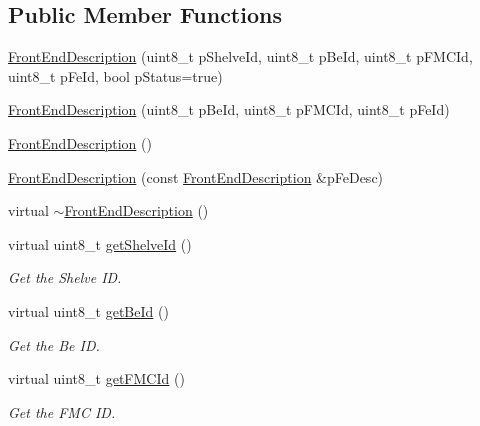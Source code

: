 \subsection*{Public Member Functions}
\begin{DoxyCompactItemize}
\item 
\hyperlink{class_ph2___hw_description_1_1_front_end_description_a9605f28b75ce29cba767fe6efb9d9d19}{Front\-End\-Description} (uint8\-\_\-t p\-Shelve\-Id, uint8\-\_\-t p\-Be\-Id, uint8\-\_\-t p\-F\-M\-C\-Id, uint8\-\_\-t p\-Fe\-Id, bool p\-Status=true)
\item 
\hyperlink{class_ph2___hw_description_1_1_front_end_description_a38c5f465c7227c8cf3f897ab88f9598c}{Front\-End\-Description} (uint8\-\_\-t p\-Be\-Id, uint8\-\_\-t p\-F\-M\-C\-Id, uint8\-\_\-t p\-Fe\-Id)
\item 
\hyperlink{class_ph2___hw_description_1_1_front_end_description_a3fc1d338b2fb7eca2c8b0038ed235daf}{Front\-End\-Description} ()
\item 
\hyperlink{class_ph2___hw_description_1_1_front_end_description_ada01bf978797bf26295f1947b6896efa}{Front\-End\-Description} (const \hyperlink{class_ph2___hw_description_1_1_front_end_description}{Front\-End\-Description} \&p\-Fe\-Desc)
\item 
virtual \hyperlink{class_ph2___hw_description_1_1_front_end_description_a8ff5e1dc9dc09e6db9c105a362000e89}{$\sim$\-Front\-End\-Description} ()
\item 
virtual uint8\-\_\-t \hyperlink{class_ph2___hw_description_1_1_front_end_description_a2599816f65ecea30824cd3d8fe1fcadc}{get\-Shelve\-Id} ()
\begin{DoxyCompactList}\small\item\em Get the Shelve I\-D. \end{DoxyCompactList}\item 
virtual uint8\-\_\-t \hyperlink{class_ph2___hw_description_1_1_front_end_description_ae2d759253890ec653dbe1b5c3141887a}{get\-Be\-Id} ()
\begin{DoxyCompactList}\small\item\em Get the Be I\-D. \end{DoxyCompactList}\item 
virtual uint8\-\_\-t \hyperlink{class_ph2___hw_description_1_1_front_end_description_a98bb84a56f109729213ea764739d7e57}{get\-F\-M\-C\-Id} ()
\begin{DoxyCompactList}\small\item\em Get the F\-M\-C I\-D. \end{DoxyCompactList}\item 

\end{DoxyCompactItemize}
